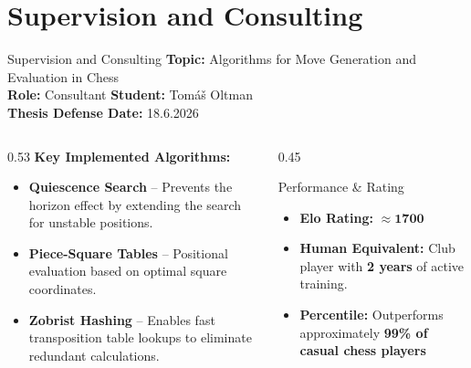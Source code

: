 \documentclass [xcolor=svgnames, t] {beamer}
\begin{document}
\section{Supervision and Consulting}
\begin{frame}{Supervision and Consulting}
\textbf{Topic:} Algorithms for Move Generation and Evaluation in Chess \\
\textbf{Role:} Consultant \hfill \textbf{Student:} Tomáš Oltman \\
\textbf{Thesis Defense Date:} 18.6.2026

\vfill %

\begin{columns}[T]
    \begin{column}{0.53\textwidth}
        \textbf{Key Implemented Algorithms:}
        \begin{itemize}
            \item \textbf{Quiescence Search} -- Prevents the horizon effect by extending the search for unstable positions.
            \item \textbf{Piece-Square Tables} -- Positional evaluation based on optimal square coordinates.
            \item \textbf{Zobrist Hashing} -- Enables fast transposition table lookups to eliminate redundant calculations.
        \end{itemize}
    \end{column}
    
    \begin{column}{0.45\textwidth} %
        \begin{exampleblock}{Performance \& Rating}
            \begin{itemize}
                \item \textbf{Elo Rating:} $\approx \mathbf{1700}$
                \item \textbf{Human Equivalent:} Club player with \textbf{2 years} of active training.
                \item \textbf{Percentile:} Outperforms approximately \textbf{99\% of casual chess players}
            \end{itemize}
        \end{exampleblock}
    \end{column}
\end{columns}
\end{frame}
\end{document}
